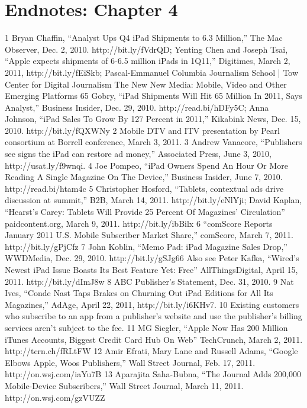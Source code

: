 \section{Endnotes: Chapter 4}
1 Bryan Chaffin, ``Analyst Ups Q4 iPad Shipments to 6.3 Million,'' The Mac Observer, Dec. 2,
2010. http://bit.ly/fVdrQD; Yenting Chen and Joseph Tsai, ``Apple expects shipments of 6-6.5
million iPads in 1Q11,'' Digitimes, March 2, 2011, http://bit.ly/fEiSkb; Pascal-Emmanuel
Columbia Journalism School | Tow Center for Digital Journalism
The New New Media: Mobile, Video and Other Emerging Platforms 65
Gobry, ``iPad Shipments Will Hit 65 Million In 2011, Says Analyst,'' Business Insider, Dec. 29,
2010. http://read.bi/hDFy5C; Anna Johnson, ``iPad Sales To Grow By 127 Percent in 2011,''
Kikabink News, Dec. 15, 2010. http://bit.ly/fQXWNy
2 Mobile DTV and ITV presentation by Pearl consortium at Borrell conference, March 3, 2011.
3 Andrew Vanacore, ``Publishers see signs the iPad can restore ad money,'' Associated Press,
June 3, 2010, http://usat.ly/f9wnqi.
4 Joe Pompeo, ``iPad Owners Spend An Hour Or More Reading A Single Magazine On The
Device,'' Business Insider, June 7, 2010. http://read.bi/htam4c
5 Christopher Hosford, ``Tablets, contextual ads drive discussion at summit,'' B2B,
March 14, 2011. http://bit.ly/eNlYji; David Kaplan, ``Hearst’s Carey: Tablets Will Provide
25 Percent Of Magazines’ Circulation'' paidcontent.org, March 9, 2011. http://bit.ly/ibBilx
6 ``comScore Reports January 2011 U.S. Mobile Subscriber Market Share,'' comScore,
March 7, 2011. http://bit.ly/gPjCfz
7 John Koblin, ``Memo Pad: iPad Magazine Sales Drop,'' WWDMedia, Dec. 29, 2010.
http://bit.ly/gSJg66 Also see Peter Kafka, ``Wired’s Newest iPad Issue Boasts Its Best Feature
Yet: Free'' AllThingsDigital, April 15, 2011. http://bit.ly/dImJ8w
8 ABC Publisher’s Statement, Dec. 31, 2010.
9 Nat Ives, ``Conde Nast Taps Brakes on Churning Out iPad Editions for All Its Magazines,''
AdAge, April 22, 2011, http://bit.ly/i6KHv7.
10 Existing customers who subscribe to an app from a publisher’s website and use the publisher’s
billing services aren’t subject to the fee.
11 MG Siegler, ``Apple Now Has 200 Million iTunes Accounts, Biggest Credit Card Hub On
Web'' TechCrunch, March 2, 2011. http://tcrn.ch/fRLtFW
12 Amir Efrati, Mary Lane and Russell Adams, ``Google Elbows Apple, Woos Publishers,''
Wall Street Journal, Feb. 17, 2011. http://on.wsj.com/iaYu7B
13 Aparajita Saha-Bubna, ``The Journal Adds 200,000 Mobile-Device Subscribers,''
Wall Street Journal, March 11, 2011. http://on.wsj.com/gzVUZZ
